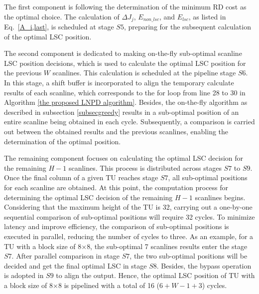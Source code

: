 \documentclass[lettersize,journal]{IEEEtran}
\begin{document}
The first component is following the determination of the minimum RD cost as the optimal choice. The calculation of $\Delta J_{j}$, $E_{non\_lsc}$, and $E_{lsc}$, as listed in Eq.~\eqref{A_i,last}, is scheduled at stage $S5$, preparing for the subsequent calculation of the optimal LSC position. 

The second component is dedicated to making on-the-fly sub-optimal scanline LSC position decisions, which is used to calculate the optimal LSC position for the previous $W$ scanlines. This calculation is scheduled at the pipeline stage $S6$. In this stage, a shift buffer is incorporated to align the temporary calculate results of each scanline, which corresponds to the for loop from line 28 to 30 in Algorithm \ref{the proposed LNPD algorithm}. 
Besides, the on-the-fly algorithm as described in subsection \ref{subsecgreedy} results in a sub-optimal position of an entire scanline being obtained in each cycle. Subsequently, a comparison is carried out between the obtained results and the previous scanlines, enabling the determination of the optimal position. 

The remaining component focuses on calculating the optimal LSC decision for the remaining $H-1$ scanlines. This process is distributed across stages $S7$ to $S9$. 
Once the final column of a given TU reaches stage $S7$, all sub-optimal positions for each scanline are obtained. 
At this point, the computation process for determining the optimal LSC decision of the remaining $H-1$ scanlines begins. 
Considering that the maximum height of the TU is 32, carrying out a one-by-one sequential comparison of sub-optimal positions will require 32 cycles. 
To minimize latency and improve efficiency, the comparison of sub-optimal positions is executed in parallel, reducing the number of cycles to three. 
As an example, for a TU with a block size of 8$\times$8, the sub-optimal 7 scanlines results enter the stage $S7$. After parallel comparison in stage $S7$, the two sub-optimal positions will be decided and get the final optimal LSC in stage $S8$. Besides, the bypass operation is adopted in $S9$ to align the output. Hence, the optimal LSC position of TU with a block size of 8$\times$8 is pipelined with a total of 16 ($6 + W - 1 + 3$) cycles. 
\end{document}
